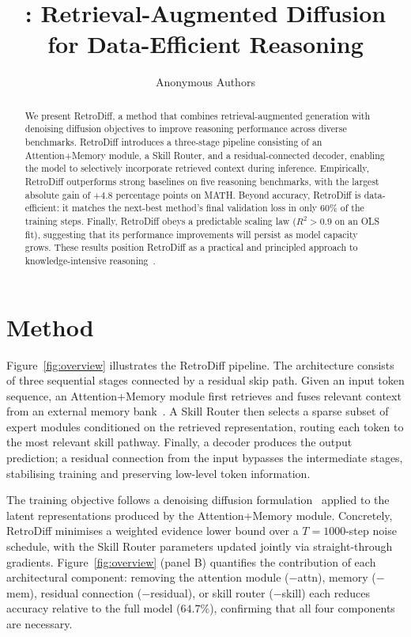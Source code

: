 \documentclass{article}
\title{\methodname: Retrieval-Augmented Diffusion for Data-Efficient Reasoning}
\author{Anonymous Authors}
\date{}
\newcommand{\Cref}[1]{Figure~\ref{#1}}
\newcommand{\methodname}{RetroDiff}
\begin{document}
\maketitle

\begin{abstract}
We present \methodname, a method that combines retrieval-augmented generation with
denoising diffusion objectives to improve reasoning performance across diverse
benchmarks. \methodname{} introduces a three-stage pipeline consisting of an
Attention+Memory module, a Skill Router, and a residual-connected decoder, enabling
the model to selectively incorporate retrieved context during inference.
Empirically, \methodname{} outperforms strong baselines on five reasoning benchmarks,
with the largest absolute gain of $+4.8$ percentage points on MATH.
Beyond accuracy, \methodname{} is data-efficient: it matches the next-best
method's final validation loss in only $60\%$ of the training steps.
Finally, \methodname{} obeys a predictable scaling law ($R^{2} > 0.9$ on an OLS fit),
suggesting that its performance improvements will persist as model capacity grows.
These results position \methodname{} as a practical and principled approach to
knowledge-intensive reasoning~\citep{zhang2024retrieval,ho2020denoising,kaplan2020scaling}.
\end{abstract}

\section{Method}

\Cref{fig:overview} illustrates the \methodname{} pipeline.
The architecture consists of three sequential stages connected by a residual skip path.
Given an input token sequence, an Attention+Memory module first retrieves and fuses
relevant context from an external memory bank~\citep{zhang2024retrieval}.
A Skill Router then selects a sparse subset of expert modules conditioned on the
retrieved representation, routing each token to the most relevant skill pathway.
Finally, a decoder produces the output prediction; a residual connection from the
input bypasses the intermediate stages, stabilising training and preserving
low-level token information.

The training objective follows a denoising diffusion formulation~\citep{ho2020denoising}
applied to the latent representations produced by the Attention+Memory module.
Concretely, \methodname{} minimises a weighted evidence lower bound over a
$T{=}1000$-step noise schedule, with the Skill Router parameters updated jointly
via straight-through gradients.
\Cref{fig:overview} (panel B) quantifies the contribution of each architectural
component: removing the attention module ($-$attn), memory ($-$mem), residual
connection ($-$residual), or skill router ($-$skill) each reduces accuracy relative
to the full model ($64.7\%$), confirming that all four components are necessary.
\end{document}
